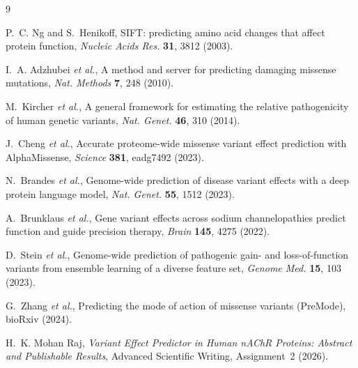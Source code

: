 \documentclass{ws-procs11x85}
\begin{document}
\begin{thebibliography}{9}

 P.~C. Ng and S.~Henikoff, SIFT: predicting amino acid
changes that affect protein function, {\em Nucleic Acids Res.}
{\bf 31}, 3812 (2003).

 I.~A. Adzhubei {\em et al.}, A method and server
for predicting damaging missense mutations, {\em Nat. Methods}
{\bf 7}, 248 (2010).

 M.~Kircher {\em et al.}, A general framework for
estimating the relative pathogenicity of human genetic variants,
{\em Nat. Genet.} {\bf 46}, 310 (2014).

 J.~Cheng {\em et al.}, Accurate proteome-wide
missense variant effect prediction with AlphaMissense, {\em Science}
{\bf 381}, eadg7492 (2023).

 N.~Brandes {\em et al.}, Genome-wide prediction of
disease variant effects with a deep protein language model,
{\em Nat. Genet.} {\bf 55}, 1512 (2023).

 A.~Brunklaus {\em et al.}, Gene variant effects
across sodium channelopathies predict function and guide precision
therapy, {\em Brain} {\bf 145}, 4275 (2022).

 D.~Stein {\em et al.}, Genome-wide prediction of
pathogenic gain- and loss-of-function variants from ensemble learning
of a diverse feature set, {\em Genome Med.} {\bf 15}, 103 (2023).

 G.~Zhang {\em et al.}, Predicting the mode of action
of missense variants (PreMode), bioRxiv (2024).

 H.~K. Mohan Raj, {\em Variant Effect Predictor
in Human nAChR Proteins: Abstract and Publishable Results}, Advanced
Scientific Writing, Assignment~2 (2026).


\end{thebibliography}
\end{document}
